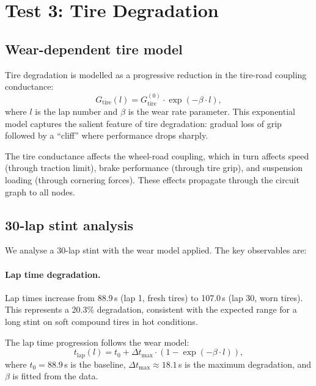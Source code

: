 \documentclass[twocolumn,10pt,a4paper]{article}
\theoremstyle{definition}
\theoremstyle{remark}
\begin{document}
\section{Test 3: Tire Degradation}\label{sec:test3}

\subsection{Wear-dependent tire model}

Tire degradation is modelled as a progressive reduction in the tire-road coupling conductance:
\begin{equation}\label{eq:tire_wear}
    G_{\mathrm{tire}}(l) = G_{\mathrm{tire}}^{(0)} \cdot \exp(-\beta \cdot l),
\end{equation}
where $l$ is the lap number and $\beta$ is the wear rate parameter. This exponential model captures the salient feature of tire degradation: gradual loss of grip followed by a ``cliff'' where performance drops sharply.

The tire conductance affects the wheel-road coupling, which in turn affects speed (through traction limit), brake performance (through tire grip), and suspension loading (through cornering forces). These effects propagate through the circuit graph to all nodes.

\subsection{30-lap stint analysis}

We analyse a 30-lap stint with the wear model applied. The key observables are:

\paragraph{Lap time degradation.}
Lap times increase from 88.9\,s (lap 1, fresh tires) to 107.0\,s (lap 30, worn tires). This represents a 20.3\% degradation, consistent with the expected range for a long stint on soft compound tires in hot conditions.

The lap time progression follows the wear model:
\begin{equation}\label{eq:lap_time}
    t_{\mathrm{lap}}(l) = t_0 + \Delta t_{\max} \cdot (1 - \exp(-\beta \cdot l)),
\end{equation}
where $t_0 = 88.9$\,s is the baseline, $\Delta t_{\max} \approx 18.1$\,s is the maximum degradation, and $\beta$ is fitted from the data.
\end{document}

